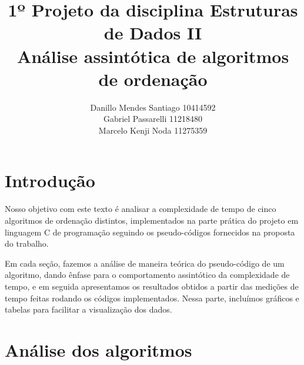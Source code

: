 \documentclass{article}
\title{%
    1º Projeto da disciplina Estruturas de Dados II \\
     \large Análise assintótica de algoritmos de ordenação}
\author{Danillo Mendes Santiago 10414592\\Gabriel Passarelli 11218480\\ Marcelo Kenji Noda 11275359}
\begin{document}
%
\maketitle
%
\section{Introdução}
Nosso objetivo com este texto é analisar a complexidade de tempo de cinco algoritmos de ordenação distintos, implementados na parte prática do projeto em linguagem C de programação seguindo os pseudo-códigos fornecidos na proposta do trabalho.\par
%
Em cada seção, fazemos a análise de maneira teórica do pseudo-código de um algoritmo, dando ênfase para o comportamento assintótico da complexidade de tempo, e em seguida apresentamos os resultados obtidos a partir das medições de tempo feitas rodando os códigos implementados. Nessa parte, incluímos gráficos e tabelas para facilitar a visualização dos dados.
%
\section{Análise dos algoritmos}
\end{document}

